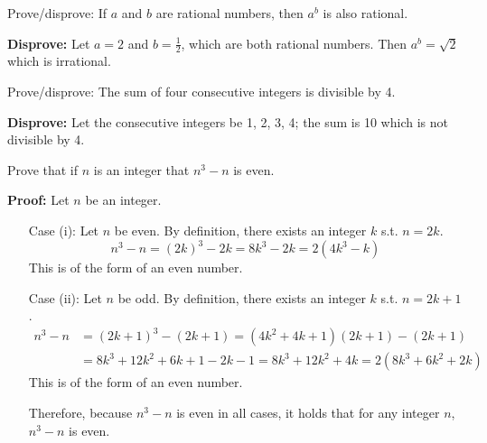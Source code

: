 \begin{questions}
\vspace{-4pt}
 Prove/disprove: If $a$ and $b$ are rational
numbers, then $a^b$ is also rational.
    \ifprintanswers
        \vspace{-12pt}
    \fi
\begin{solution}
    \textbf{Disprove:} Let $a=2$ and $b=\frac{1}{2}$, which are both rational numbers.  Then $a^b =
    \sqrt{2}$ which is irrational.
\end{solution}

\vspace{-4pt}
 Prove/disprove: The sum of four consecutive integers is divisible by 4.
    \ifprintanswers
        \vspace{-10pt}
    \fi
\begin{solution}
    \textbf{Disprove:} Let the consecutive integers be 1, 2, 3, 4; the sum is 10 which is not divisible by 4.
\end{solution}


\ifprintanswers
  \newpage 
\fi 
{} Prove that if $n$ is an integer that $n^3 - n$ is even.
    \ifprintanswers
        \vspace{-10pt}
    \fi
\begin{solution} \textbf{Proof:} Let $n$ be an integer.
    \begin{itemize}[itemsep=0pt,parsep=0pt,topsep=0pt,partopsep=0pt]
        \item[Case] (i): Let $n$ be even. By definition, there exists an integer $k$ s.t. $n=2k$.
            \[ n^3 - n = (2k)^3 - 2k = 8k^3 - 2k = 2(4k^3 - k) \]
        This is of the form of an even number.
        \item[Case] (ii):  Let $n$ be odd.  By definition, there exists an integer $k$ s.t. $n = 2k+1$.
            \begin{align*}
                n^3 - n &= (2k+1)^3 - (2k+1) = (4k^2 + 4k+ 1)(2k + 1) - (2k+1) \\
                &= 8k^3 + 12k^2 + 6k + 1 - 2k - 1 = 8k^3 + 12k^2 + 4k = 2(8k^3 + 6k^2 + 2k)
            \end{align*}
        This is of the form of an even number.

        Therefore, because $n^3 - n$ is even in all cases, it holds that for any integer $n$, $n^3 - n$ is even.
    \end{itemize}
\end{solution}




\end{questions}
